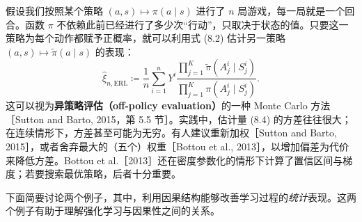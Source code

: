 假设我们按照某个策略 $(a,s)\mapsto\pi(a\mid s)$ 进行了 $n$ 局游戏，每一局就是一个回合。函数 $\pi$ 不依赖此前已经进行了多少次“行动”，只取决于状态的值。只要这一策略为每个动作都赋予正概率，就可以利用式 (8.2) 估计另一策略 $(a,s)\mapsto\widetilde\pi(a\mid s)$ 的表现：
\begin{equation}
 \widehat\xi_{n,\mathrm{ERL}}\coloneqq\frac1n\sum_{i=1}^nY^i
 \frac{\prod_{j=1}^K\widetilde\pi(A_j^i\mid S_j^i)}
 {\prod_{j=1}^K\pi(A_j^i\mid S_j^i)}.
 \tag{8.4}
\end{equation}
这可以视为\textbf{异策略评估（off-policy evaluation）}的一种 Monte Carlo 方法［Sutton and Barto, 2015，第 5.5 节］。实践中，估计量 (8.4) 的方差往往很大；在连续情形下，方差甚至可能为无穷。有人建议重新加权［Sutton and Barto, 2015］，或者舍弃最大的（五个）权重［Bottou et al., 2013］，以增加偏差为代价来降低方差。Bottou et al.［2013］还在密度参数化的情形下计算了置信区间与梯度；若要搜索最优策略，后者十分重要。

下面简要讨论两个例子，其中，利用因果结构能够改善学习过程的\emph{统计}表现。这两个例子有助于理解强化学习与因果性之间的关系。
